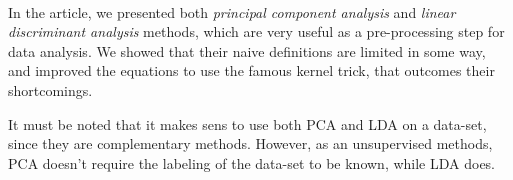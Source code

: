 \paragraph{}
In the article, we presented both \emph{principal component analysis} and \emph{linear discriminant analysis} methods, which are very useful as a pre-processing step for data analysis. We showed that their naive definitions are limited in some way, and improved the equations to use the famous kernel trick, that outcomes their shortcomings.

It must be noted that it makes sens to use both PCA and LDA on a data-set, since they are complementary methods. However, as an unsupervised methods, PCA doesn't require the labeling of the data-set to be known, while LDA does.
